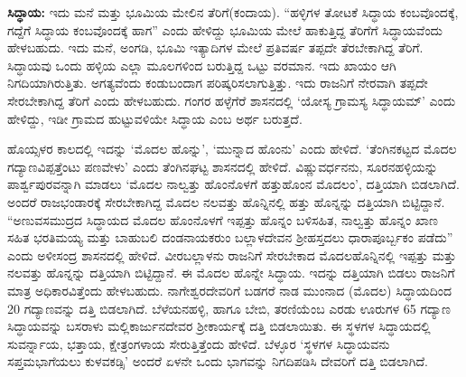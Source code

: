 \textbf{ಸಿದ್ಧಾಯ:} ಇದು ಮನೆ ಮತ್ತು ಭೂಮಿಯ ಮೇಲಿನ ತೆರಿಗೆ(ಕಂದಾಯ). “ಹಳ್ಳಿಗಳ ತೋಟಕೆ ಸಿದ್ಧಾಯ ಕಂಬವೊಂದಕ್ಕೆ, ಗದ್ದೆಗೆ ಸಿದ್ಧಾಯ ಕಂಬವೊಂದಕ್ಕೆ ಹಾಗ” ಎಂದು ಹೇಳಿದ್ದು ಭೂಮಿಯ ಮೇಲೆ ಹಾಕುತ್ತಿದ್ದ ತೆರಿಗೆಗೆ ಸಿದ್ಧಾಯವೆಂದು ಹೇಳಬಹುದು. ಇದು ಮನೆ, ಅಂಗಡಿ, ಭೂಮಿ ಇತ್ಯಾದಿಗಳ ಮೇಲೆ ಪ್ರತಿವರ್ಷ ತಪ್ಪದೇ ತೆರಬೇಕಾಗಿದ್ದ ತೆರಿಗೆ. ಸಿದ್ಧಾಯವು ಒಂದು ಹಳ್ಳಿಯ ಎಲ್ಲಾ ಮೂಲಗಳಿಂದ ಬರುತ್ತಿದ್ದ ಒಟ್ಟು ವರಮಾನ. ಇದು ಖಾಯಂ ಆಗಿ ನಿಗದಿಯಾಗಿರುತ್ತಿತು. ಅಗತ್ಯವೆಂದು ಕಂಡುಬಂದಾಗ ಪರಿಷ್ಕರಿಸಲಾಗುತ್ತಿತ್ತು. ಇದು ರಾಜನಿಗೆ ನೇರವಾಗಿ ತಪ್ಪದೇ ಸೇರಬೇಕಾಗಿದ್ದ ತೆರಿಗೆ ಎಂದು ಹೇಳಬಹುದು. ಗಂಗರ ಹಳ್ಳೆಗೆರೆ ಶಾಸನದಲ್ಲಿ ‘ಯೋಸ್ಯ ಗ್ರಾಮಸ್ಯ ಸಿದ್ಧಾಯಮ್’ ಎಂದು ಹೇಳಿದ್ದು, ಇಡೀ ಗ್ರಾಮದ ಹುಟ್ಟುವಳಿಯೇ ಸಿದ್ಧಾಯ ಎಂಬ ಅರ್ಥ ಬರುತ್ತದೆ.

ಹೊಯ್ಸಳರ ಕಾಲದಲ್ಲಿ ಇದನ್ನು ‘ಮೊದಲ ಹೊನ್ನು’, ‘ಮುನ್ನಾದ ಹೊಂನು’ ಎಂದು ಹೇಳಿದೆ. ‘ತೆಂಗಿನಕಟ್ಟದ ಮೊದಲ ಗದ್ಯಾಣವಿಪ್ಪತ್ತೆಂಟು ಪಣವೇಳು’ ಎಂದು ತೆಂಗಿನಘಟ್ಟ ಶಾಸನದಲ್ಲಿ ಹೇಳಿದೆ. ವಿಷ್ಣುವರ್ಧನನು, ಸೂರನಹಳ್ಳಿಯನ್ನು ಪಾರ್ಶ್ವಪುರವನ್ನಾಗಿ ಮಾಡಲು ‘ಮೊದಲ ನಾಲ್ವತ್ತು ಹೊಂನೊಳಗೆ ಹತ್ತುಹೊಂನ ಮೊದಲಂ’, ದತ್ತಿಯಾಗಿ ಬಿಡಲಾಗಿದೆ. ಅಂದರೆ ರಾಜಭಂಡಾರಕ್ಕೆ ಸೇರಬೇಕಾಗಿದ್ದ ಮೊದಲ ನಲವತ್ತು ಹೊನ್ನಿನಲ್ಲಿ ಹತ್ತು ಹೊನ್ನನ್ನು ದತ್ತಿಯಾಗಿ ಬಿಟ್ಟಿದ್ದಾನೆ. “ಅಣುವಸಮುದ್ರದ ಸಿದ್ಧಾಯದ ಮೊದಲ ಹೊಂನೊಳಗೆ ಇಪ್ಪತ್ತು ಹೊನ್ನಂ ಬಳಿಸಹಿತ, ನಾಲ್ವತ್ತು ಹೊನ್ನಂ ಖಾಣ ಸಹಿತ ಭರತಿಮಯ್ಯ ಮತ್ತು ಬಾಹುಬಲಿ ದಂಡನಾಯಕರುಂ ಬಲ್ಲಾಳದೇವನ ಶ‍್ರೀಹಸ್ತದಲು ಧಾರಾಪೂರ್ಬ್ಬಕಂ ಪಡೆದು” ಎಂದು ಅಳೀಸಂದ್ರ ಶಾಸನದಲ್ಲಿ ಹೇಳಿದೆ. ವೀರಬಲ್ಲಾಳನು ರಾಜನಿಗೆ ಸೇರಬೇಕಾದ ಮೊದಲಹೊನ್ನಿನಲ್ಲಿ ಇಪ್ಪತ್ತು ಮತ್ತು ನಲವತ್ತು ಹೊನ್ನನ್ನು ದತ್ತಿಯಾಗಿ ಬಿಟ್ಟಿದ್ದಾನೆ. ಈ ಮೊದಲ ಹೊನ್ನೇ ಸಿದ್ಧಾಯ. ಇದನ್ನು ದತ್ತಿಯಾಗಿ ಬಿಡಲು ರಾಜನಿಗೆ ಮಾತ್ರ ಅಧಿಕಾರವಿತ್ತೆಂದು ಹೇಳಬಹುದು. ನಾಗೇಶ್ವರದೇವರಿಗೆ ಬಡಗರೆ ನಾಡ ಮುಂನಾದ (ಮೊದಲ) ಸಿದ್ಧಾಯದಿಂದ 20 ಗದ್ಯಾಣವನ್ನು ದತ್ತಿ ಬಿಡಲಾಗಿದೆ. ಬೆಳೆಯನಹಳ್ಳಿ, ಹಾಗೂ ಬೇಬಿ, ತರಣಿಯೆಂಬ ಎರಡು ಊರುಗಳ 65 ಗದ್ಯಾಣ ಸಿದ್ಧಾಯವನ್ನು ಬಸರಾಳು ಮಲ್ಲಿಕಾರ್ಜುನದೇವರ ಶ‍್ರೀಕಾರ್ಯಕ್ಕೆ ದತ್ತಿ ಬಿಡಲಾಯಿತು. ಈ ಸ್ಥಳಗಳ ಸಿದ್ಧಾಯದಲ್ಲಿ ಸುವರ್ನ್ನಾಯ, ಭತ್ತಾಯ, ಕ್ಷೇತ್ರಂಗಳಾಯ ಸೇರುತ್ತಿತ್ತೆಂದು ಹೇಳಿದೆ. ಬೆಳ್ಳೂರ ‘ಸ್ಥಳಗಳ ಸಿದ್ಧಾಯವನು ಸಪ್ತಮಭಾಗೆಯಲು ಕುಳವಕಡ್ಸಿ’ ಅಂದರೆ ಏಳನೇ ಒಂದು ಭಾಗವನ್ನು ನಿಗದಿಪಡಿಸಿ ದೇವರಿಗೆ ದತ್ತಿ ಬಿಡಲಾಗಿದೆ.

